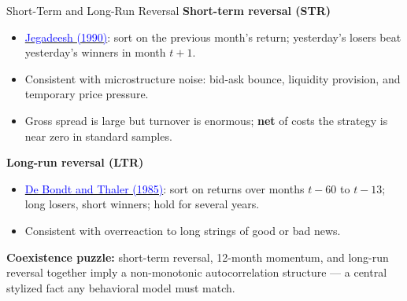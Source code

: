\documentclass{beamer}
\begin{document}
\begin{frame}{Short-Term and Long-Run Reversal}
	\textbf{Short-term reversal (STR)}
	\begin{itemize}
		\item \href{https://doi.org/10.1111/j.1540-6261.1990.tb03695.x}{\textcolor{blue}{Jegadeesh (1990)}}: sort on the previous month's return; yesterday's losers beat yesterday's winners in month $t+1$.
		\item Consistent with microstructure noise: bid-ask bounce, liquidity provision, and temporary price pressure.
		\item Gross spread is large but turnover is enormous; \textbf{net} of costs the strategy is near zero in standard samples.
	\end{itemize}

	\textbf{Long-run reversal (LTR)}
	\begin{itemize}
		\item \href{https://doi.org/10.1111/j.1540-6261.1985.tb05004.x}{\textcolor{blue}{De Bondt and Thaler (1985)}}: sort on returns over months $t-60$ to $t-13$; long losers, short winners; hold for several years.
		\item Consistent with overreaction to long strings of good or bad news.
	\end{itemize}

	\textbf{Coexistence puzzle:} short-term reversal, 12-month momentum, and long-run reversal together imply a non-monotonic autocorrelation structure --- a central stylized fact any behavioral model must match.
\end{frame}
\end{document}
